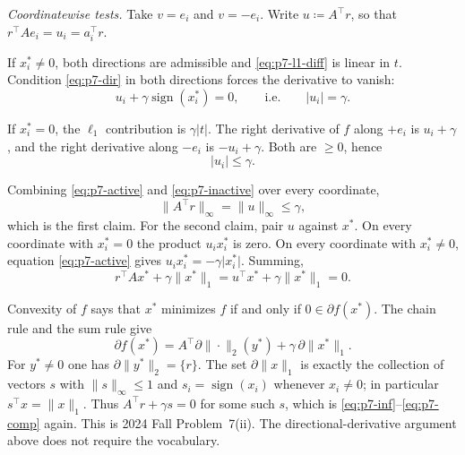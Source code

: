 \emph{Coordinatewise tests.} Take \(v=e_{i}\) and \(v=-e_{i}\). Write \(u\coloneqq A^{\top}r\), so that \(r^{\top}Ae_{i}=u_{i}=a_{i}^{\top}r\).

If \(x_{i}^{*}\neq 0\), both directions are admissible and \eqref{eq:p7-l1-diff} is linear in \(t\). Condition \eqref{eq:p7-dir} in both directions forces the derivative to vanish:
\begin{equation}
\label{eq:p7-active}
u_{i}+\gamma\operatorname{sign}(x_{i}^{*})=0,
\qquad\text{i.e.}\qquad
\lvert u_{i}\rvert=\gamma.
\end{equation}

If \(x_{i}^{*}=0\), the \(\ell_1\) contribution is \(\gamma\lvert t\rvert\). The right derivative of \(f\) along \(+e_{i}\) is \(u_{i}+\gamma\), and the right derivative along \(-e_{i}\) is \(-u_{i}+\gamma\). Both are \(\ge 0\), hence
\begin{equation}
\label{eq:p7-inactive}
\lvert u_{i}\rvert\le\gamma.
\end{equation}

Combining \eqref{eq:p7-active} and \eqref{eq:p7-inactive} over every coordinate,
\begin{equation}
\label{eq:p7-inf}
\|A^{\top}r\|_{\infty}
=
\|u\|_{\infty}
\le\gamma,
\end{equation}
which is the first claim. For the second claim, pair \(u\) against \(x^{*}\). On every coordinate with \(x_{i}^{*}=0\) the product \(u_{i}x_{i}^{*}\) is zero. On every coordinate with \(x_{i}^{*}\neq 0\), equation \eqref{eq:p7-active} gives \(u_{i}x_{i}^{*}=-\gamma\lvert x_{i}^{*}\rvert\). Summing,
\begin{equation}
\label{eq:p7-comp}
r^{\top}Ax^{*}+\gamma\|x^{*}\|_{1}
=
u^{\top}x^{*}+\gamma\|x^{*}\|_{1}
=
0.
\end{equation}

\begin{remark}
\label{rem:p7-subgrad}
Convexity of \(f\) says that \(x^{*}\) minimizes \(f\) if and only if \(0\in\partial f(x^{*})\). The chain rule and the sum rule give
\[
\partial f(x^{*})
=
A^{\top}\partial\|\cdot\|_{2}(y^{*})+\gamma\,\partial\|x^{*}\|_{1}.
\]
For \(y^{*}\neq 0\) one has \(\partial\|y^{*}\|_{2}=\{r\}\). The set \(\partial\|x\|_{1}\) is exactly the collection of vectors \(s\) with \(\|s\|_{\infty}\le 1\) and \(s_{i}=\operatorname{sign}(x_{i})\) whenever \(x_{i}\neq 0\); in particular \(s^{\top}x=\|x\|_{1}\). Thus \(A^{\top}r+\gamma s=0\) for some such \(s\), which is \eqref{eq:p7-inf}--\eqref{eq:p7-comp} again. This is 2024 Fall Problem~7(ii). The directional-derivative argument above does not require the vocabulary.
\end{remark}

